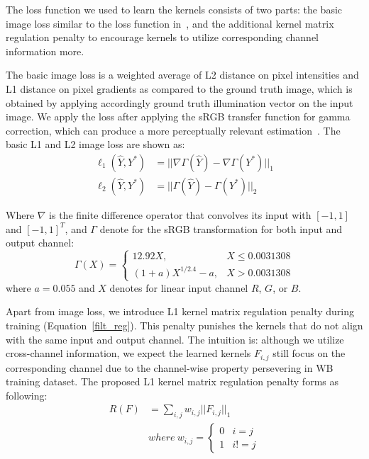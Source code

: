 \documentclass[10pt,twocolumn,letterpaper]{article}
\begin{document}
The loss function we used to learn the kernels consists of two parts:
the basic image loss similar to the loss function in~\cite{DBLP:journals/corr/abs-1712-02327},
and the additional kernel matrix regulation penalty to encourage kernels to utilize corresponding channel information more.

The basic image loss is a weighted average of L2 distance on pixel intensities and
L1 distance on pixel gradients as compared to the ground truth image,
which is obtained by applying accordingly ground truth illumination vector on the input image.
We apply the loss after applying the sRGB transfer function for gamma correction,
which can produce a more perceptually relevant estimation~\cite{DBLP:journals/corr/abs-1712-02327}.
The basic L1 and L2 image loss are shown as:
\begin{equation}
\left.\begin{aligned}
\ell_1(\hat Y, Y^*) & = ||\nabla \Gamma(\hat Y) - \nabla \Gamma(Y^*)||_1 \\
\ell_2(\hat Y, Y^*) & = ||\Gamma(\hat Y) - \Gamma(Y^*)||_2
\end{aligned}\right.
\label{img_loss}
\end{equation}

Where $\nabla$ is the finite difference operator that convolves its input with $[-1,1]$ and $[-1,1]^T$,
and $\Gamma$ denote for the sRGB transformation for both input and output channel:
\begin{equation}
\Gamma(X)={\begin{cases}12.92X,&X\leq 0.0031308\\(1+a)X^{1/2.4}-a,&X>0.0031308\end{cases}}
\label{rgb2srgb}
\end{equation}
where $a = 0.055$ and $X$ denotes for linear input channel $R$, $G$, or $B$.

Apart from image loss, we introduce L1 kernel matrix regulation penalty during training (Equation~\ref{filt_reg}).
This penalty punishes the kernels that do not align with the same input and output channel.
The intuition is: although we utilize cross-channel information,
we expect the learned kernels $F_{i,j}$ still focus on the corresponding channel
due to the channel-wise property persevering in WB training dataset.
The proposed L1 kernel matrix regulation penalty forms as following:
\begin{equation}
\left.\begin{aligned}
R(F) & = \sum_{i,j}w_{i,j}||F_{i,j}||_1 \\
& where \ w_{i,j} = {\begin{cases}0 &  i = j \\
   1 & i != j \end{cases}}
\end{aligned}\right.
\label{filt_reg}
\end{equation}
\end{document}
